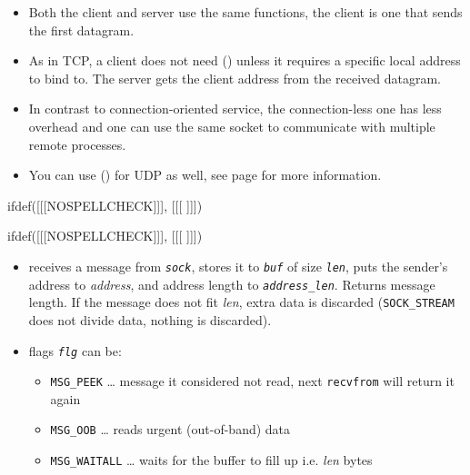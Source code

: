 \begin{slide}

\end{slide}

\begin{itemize}
\item Both the client and server use the same functions, the client is one that
sends the first datagram.
\item As in TCP, a client does not need () unless it requires a
specific local address to bind to.  The server gets the client address from the
received datagram.
\item In contrast to connection-oriented service, the connection-less one has
less overhead and one can use the same socket to communicate with multiple
remote processes.
\item You can use () for UDP as well, see page
\pageref{CONNECT_FOR_UDP} for more information.
\end{itemize}


ifdef([[[NOSPELLCHECK]]], [[[
]]])

\begin{slide}
\setlength{\baselineskip}{0.8\baselineskip}
ifdef([[[NOSPELLCHECK]]], [[[
]]])
\begin{itemize}
\item receives a message from \emph{\texttt{sock}}, stores it to
\emph{\texttt{buf}}
of size \emph{\texttt{l{}en}}, puts the sender's address to \emph{address},
and address length to \emph{\texttt{address\_len}}.  Returns message length.
If the message does not fit \emph{l{}en}, extra data is discarded
(\texttt{SOCK\_STREAM} does not divide data, nothing is discarded).
\item flags \emph{\texttt{flg}} can be:
    \begin{itemize}
    \item \texttt{MSG\_PEEK} \dots{} message it considered not read, next
    \texttt{recvfrom} will return it again
    \item \texttt{MSG\_OOB} \dots{} reads urgent (out-of-band)
    data 
    \item \texttt{MSG\_WAITALL} \dots{} waits for the buffer to fill up
    i.e. \emph{l{}en} bytes
    \end{itemize}
\end{itemize}
\end{slide}

